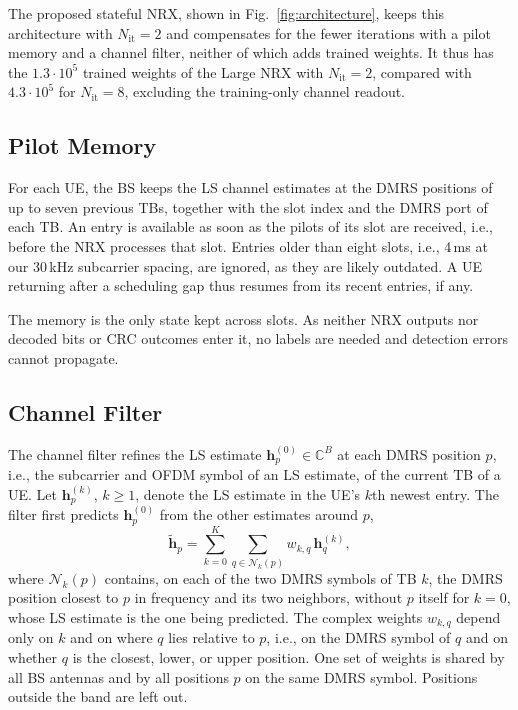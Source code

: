 The proposed stateful NRX, shown in Fig.~\ref{fig:architecture}, keeps this architecture with $N_{\mathrm{it}}=2$ and compensates for the fewer iterations with a pilot memory and a channel filter, neither of which adds trained weights. It thus has the $1.3\cdot 10^{5}$ trained weights of the Large NRX with $N_{\mathrm{it}}=2$, compared with $4.3\cdot 10^{5}$ for $N_{\mathrm{it}}=8$, excluding the training-only channel readout.

\subsection{Pilot Memory}
For each UE, the BS keeps the LS channel estimates at the DMRS positions of up to seven previous TBs, together with the slot index and the DMRS port of each TB. An entry is available as soon as the pilots of its slot are received, i.e., before the NRX processes that slot. Entries older than eight slots, i.e., 4\,ms at our 30\,kHz subcarrier spacing, are ignored, as they are likely outdated. A UE returning after a scheduling gap thus resumes from its recent entries, if any.

The memory is the only state kept across slots. As neither NRX outputs nor decoded bits or CRC outcomes enter it, no labels are needed and detection errors cannot propagate.

\subsection{Channel Filter}
The channel filter refines the LS estimate $\mathbf{h}^{(0)}_{p}\in\mathbb{C}^{B}$ at each DMRS position $p$, i.e., the subcarrier and OFDM symbol of an LS estimate, of the current TB of a UE. Let $\mathbf{h}^{(k)}_{p}$, $k\geq 1$, denote the LS estimate in the UE's $k$th newest entry. The filter first predicts $\mathbf{h}^{(0)}_{p}$ from the other estimates around $p$,
\begin{equation}
\tilde{\mathbf{h}}_{p}=\sum_{k=0}^{K}\sum_{q\in\mathcal{N}_{k}(p)}w_{k,q}\,\mathbf{h}^{(k)}_{q},
\label{eq:prediction}
\end{equation}
where $\mathcal{N}_{k}(p)$ contains, on each of the two DMRS symbols of TB $k$, the DMRS position closest to $p$ in frequency and its two neighbors, without $p$ itself for $k=0$, whose LS estimate is the one being predicted. The complex weights $w_{k,q}$ depend only on $k$ and on where $q$ lies relative to $p$, i.e., on the DMRS symbol of $q$ and on whether $q$ is the closest, lower, or upper position. One set of weights is shared by all BS antennas and by all positions $p$ on the same DMRS symbol. Positions outside the band are left out.

